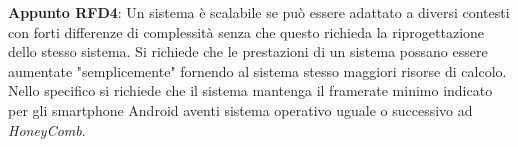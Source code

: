 \begin{center}
    \textbf{Appunto RFD4}: Un sistema è scalabile se può essere adattato a diversi contesti con forti differenze di complessità senza che questo richieda la riprogettazione dello stesso sistema. Si richiede che le prestazioni di un sistema possano essere aumentate "semplicemente" fornendo al sistema stesso maggiori risorse di calcolo. Nello specifico si richiede che il sistema mantenga il framerate minimo indicato per gli smartphone Android aventi sistema operativo uguale o successivo ad \textit{HoneyComb}.
\end{center}


